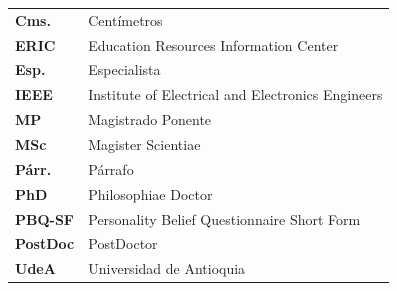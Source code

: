 \begin{tabular}{m{2cm}p{10cm}}
    \textbf{Cms.}	    &	Centímetros\\
    \textbf{ERIC}	    &	Education Resources Information Center\\
    \textbf{Esp.}	    &	Especialista\\
    \textbf{IEEE}		&	Institute of Electrical and Electronics Engineers \\
    \textbf{MP}		    &	Magistrado Ponente\\
    \textbf{MSc}		&	Magister Scientiae\\
    \textbf{Párr.}	    &	Párrafo\\
    \textbf{PhD}		&	Philosophiae Doctor\\
    \textbf{PBQ-SF} 	&	Personality Belief Questionnaire Short Form\\
    \textbf{PostDoc}	&	PostDoctor\\
    \textbf{UdeA}	    &	Universidad de Antioquia
\end{tabular}
